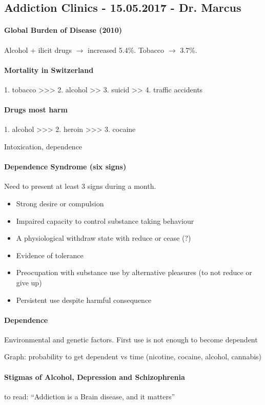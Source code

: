 \documentclass[12pt,article,oneside,a4paper]{memoir}
\begin{document}
\subsection{Addiction Clinics - 15.05.2017 - Dr. Marcus}
\paragraph{Global Burden of Disease (2010)} Alcohol + ilicit drugs $\rightarrow$ increased 5.4\%. Tobacco $\rightarrow$ 3.7\%.

\paragraph{Mortality in Switzerland} 1. tobacco >>> 2. alcohol >> 3. suicid >> 4. traffic accidents

\paragraph{Drugs most harm} 1. alcohol >>> 2. heroin >>> 3. cocaine

Intoxication, dependence

\paragraph{Dependence Syndrome (six signs)} Need to present at least 3 signs during a month.
\begin{itemize}
\item Strong desire or compulsion
\item Impaired capacity to control substance taking behaviour
\item A physiological withdraw state with reduce or cease (?)
\item Evidence of tolerance
\item Preocupation with substance use by alternative pleasures (to not reduce or give up)
\item Persistent use despite harmful consequence
\end{itemize}

\paragraph{Dependence} Environmental and genetic factors. First use is not enough to become dependent

Graph: probability to get dependent vs time (nicotine, cocaine, alcohol, cannabis)

\paragraph{Stigmas of Alcohol, Depression and Schizophrenia} to read: ``Addiction is a Brain disease, and it matters''
\end{document}

